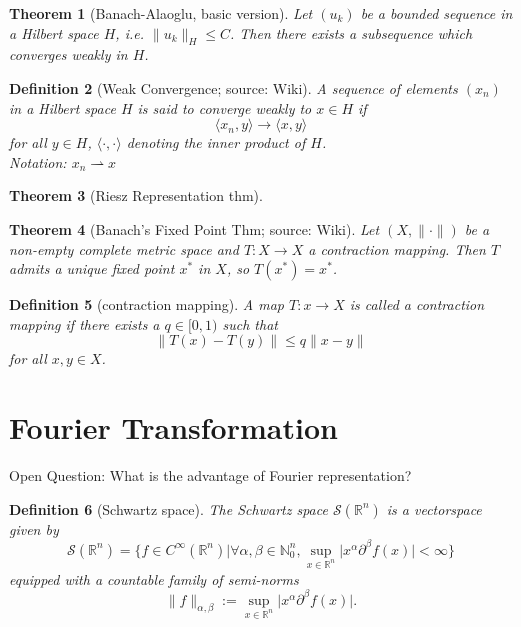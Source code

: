 \documentclass[12pt,a4paper]{article}
\newtheorem{definition}{Definition}
\newtheorem{thm}[definition]{Theorem}
\begin{document}
\begin{thm}[Banach-Alaoglu, basic version]
Let $(u_k)$ be a bounded sequence in a Hilbert space $H$, i.e. $\lVert u_k \rVert_H \leq C$. Then there exists a subsequence which converges weakly in $H$.
\end{thm}

\begin{definition}[Weak Convergence; source: Wiki]
A sequence of elements $(x_n)$ in a Hilbert space $H$ is said to converge weakly to $x\in H$ if
\begin{equation}
\langle x_n, y \rangle \rightarrow \langle x, y \rangle
\end{equation}
for all $y\in H$, $\langle \cdot , \cdot \rangle$ denoting the inner product of $H$. \\
Notation: $x_n \rightharpoonup x$
\end{definition}

\begin{thm}[Riesz Representation thm]
\end{thm}

\begin{thm}[Banach's Fixed Point Thm; source: Wiki]
Let $(X,\lVert \cdot \rVert)$ be a non-empty complete metric space and $T:X\rightarrow X$ a contraction mapping. Then $T$ admits a unique fixed point $x^*$ in $X$, so $T(x^*)=x^*$.
\end{thm}

\begin{definition}[contraction mapping]
A map $T:x\rightarrow X$ is called a contraction mapping if there exists a $q\in [0,1)$ such that
\begin{equation}
\lVert T(x)-T(y) \rVert \leq q \lVert x-y \rVert
\end{equation}
for all $x,y\in X$.
\end{definition}

\section{Fourier Transformation}

Open Question: What is the advantage of Fourier representation?

\begin{definition}[Schwartz space]
The Schwartz space $\mathcal{S}(\mathbb{R}^n)$ is a vectorspace given by
\begin{equation}
\mathcal{S}(\mathbb{R}^n)=\{f\in C^{\infty}(\mathbb{R}^n)\lvert \forall \alpha,\beta\in \mathbb{N}^n_0, \sup_{x\in\mathbb{R}^n}\lvert x^{\alpha}\partial^{\beta}f(x)\rvert <\infty\}
\end{equation}
equipped with a countable family of semi-norms
\begin{equation}
\lVert f \rVert_{\alpha,\beta} := \sup_{x\in\mathbb{R}^n}\lvert x^{\alpha}\partial^{\beta}f(x)\rvert.
\end{equation}
\end{definition}
\end{document}
